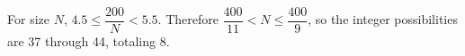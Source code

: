 For size $N$, $4.5\le\dfrac{200}{N}<5.5$. Therefore $\dfrac{400}{11}<N\le\dfrac{400}{9}$, so the integer possibilities are 37 through 44, totaling $\boxed8$.
